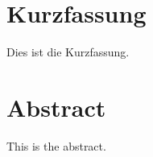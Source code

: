 
{
\chapter*{Kurzfassung}
\label{Abstract_de}
  Dies ist die Kurzfassung.

  \lipsum[1-2]

  \newpage
}
{}

\chapter*{Abstract}
\label{Abstract}

This is the abstract.

\lipsum[1-2]
